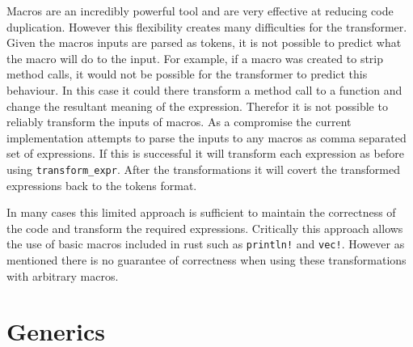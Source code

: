 \documentclass[ oneside,%
                    author={James Elgar},
                    degree={MEng},
                     title={Bidirectional transformer between functional and \\ object-oriented programming in Rust},
                  subtitle={}]{dissertation}
\newcommand{\rust}[1]{\texttt{#1}}
\begin{document}
Macros are an incredibly powerful tool and are very effective at reducing code duplication. However this flexibility creates many difficulties for the transformer. Given the macros inputs are parsed as tokens, it is not possible to predict what the macro will do to the input. For example, if a macro was created to strip method calls, it would not be possible for the transformer to predict this behaviour. In this case it could there transform a method call to a function and change the resultant meaning of the expression. 
Therefor it is not possible to reliably transform the inputs of macros. As a compromise the current implementation attempts to parse the inputs to any macros as comma separated set of expressions. If this is successful it will transform each expression as before using \verb|transform_expr|. After the transformations it will covert the transformed expressions back to the tokens format.

In many cases this limited approach is sufficient to maintain the correctness of the code and transform the required expressions. Critically this approach allows the use of basic macros included in rust such as \rust{println!} and \rust{vec!}. However as mentioned there is no guarantee of correctness when using these transformations with arbitrary macros.


\section{Generics}



\end{document}
